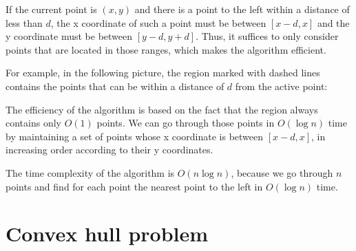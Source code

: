 If the current point is $(x,y)$
and there is a point to the left
within a distance of less than $d$,
the x coordinate of such a point must
be between $[x-d,x]$ and the y coordinate
must be between $[y-d,y+d]$.
Thus, it suffices to only consider points
that are located in those ranges,
which makes the algorithm efficient.

For example, in the following picture, the
region marked with dashed lines contains
the points that can be within a distance of $d$
from the active point:

\begin{center}
\end{center}

The efficiency of the algorithm is based on the fact
that the region always contains
only $O(1)$ points.
We can go through those points in $O(\log n)$ time
by maintaining a set of points whose x coordinate
is between $[x-d,x]$, in increasing order according
to their y coordinates.

The time complexity of the algorithm is $O(n \log n)$,
because we go through $n$ points and
find for each point the nearest point to the left
in $O(\log n)$ time.

\section{Convex hull problem}

